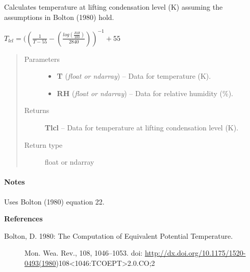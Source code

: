 \documentclass[letterpaper,10pt,english]{sphinxmanual}
\begin{document}
\begin{fulllineitems}
\label{atmos:atmos.equations.Tlcl_from_T_RH}
Calculates temperature at lifting condensation level (K) assuming the
assumptions in Bolton (1980) hold.

\(T_{lcl} = ((\frac{1}{T-55}-(\frac{log(\frac{RH}{100})}{2840}))^{-1} + 55\)
\begin{quote}\begin{description}
\item[{Parameters}] \leavevmode\begin{itemize}
\item {} 
\textbf{T} (\emph{float or ndarray}) -- Data for temperature (K).

\item {} 
\textbf{RH} (\emph{float or ndarray}) -- Data for relative humidity (\%).

\end{itemize}

\item[{Returns}] \leavevmode
\textbf{Tlcl} --
Data for temperature at lifting condensation level (K).

\item[{Return type}] \leavevmode
float or ndarray

\end{description}\end{quote}
\paragraph{Notes}

Uses Bolton (1980) equation 22.

\textbf{References}
\begin{description}
\item[{Bolton, D. 1980: The Computation of Equivalent Potential Temperature.}] \leavevmode
Mon. Wea. Rev., 108, 1046–1053.
doi: \href{http://dx.doi.org/10.1175/1520-0493(1980}{http://dx.doi.org/10.1175/1520-0493(1980})108\textless{}1046:TCOEPT\textgreater{}2.0.CO;2

\end{description}

\end{fulllineitems}

\end{document}

